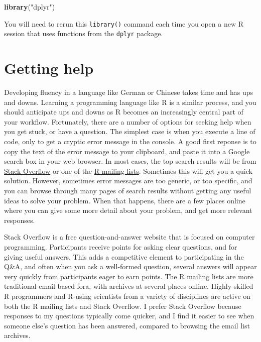 \documentclass[]{book}
\newenvironment{Shaded}{\begin{snugshade}}{\end{snugshade}}
\newcommand{\KeywordTok}[1]{\textcolor[rgb]{0.13,0.29,0.53}{\textbf{{#1}}}}
\newcommand{\StringTok}[1]{\textcolor[rgb]{0.31,0.60,0.02}{{#1}}}
\newcommand{\NormalTok}[1]{{#1}}
\begin{document}
\begin{Shaded}
\begin{Highlighting}[]
\KeywordTok{library}\NormalTok{(}\StringTok{"dplyr"}\NormalTok{)}
\end{Highlighting}
\end{Shaded}

You will need to rerun this \texttt{library()} command each time you
open a new R session that uses functions from the \texttt{dplyr}
package.

\section{Getting help}\label{getting-help}

Developing fluency in a language like German or Chinese takes time and
has ups and downs. Learning a programming language like R is a similar
process, and you should anticipate ups and downs as R becomes an
increasingly central part of your workflow. Fortunately, there are a
number of options for seeking help when you get stuck, or have a
question. The simplest case is when you execute a line of code, only to
get a cryptic error message in the console. A good first reponse is to
copy the text of the error message to your clipboard, and paste it into
a Google search box in your web browser. In most cases, the top search
results will be from \href{http://stackoverflow.com/}{Stack Overflow} or
one of the \href{https://www.r-project.org/mail.html}{R mailing lists}.
Sometimes this will get you a quick solution. However, sometimes error
messages are too generic, or too specific, and you can browse through
many pages of search results without getting any useful ideas to solve
your problem. When that happens, there are a few places online where you
can give some more detail about your problem, and get more relevant
responses.

Stack Overflow is a free question-and-answer website that is focused on
computer programming. Participants receive points for asking clear
questions, and for giving useful answers. This adds a competitive
element to participating in the Q\&A, and often when you ask a
well-formed question, several answers will appear very quickly from
participants eager to earn points. The R mailing lists are more
traditional email-based fora, with archives at several places online.
Highly skilled R programmers and R-using scientists from a variety of
disciplines are active on both the R mailing lists and Stack Overflow. I
prefer Stack Overflow because responses to my questions typically come
quicker, and I find it easier to see when someone else's question has
been answered, compared to browsing the email list archives.
\end{document}
